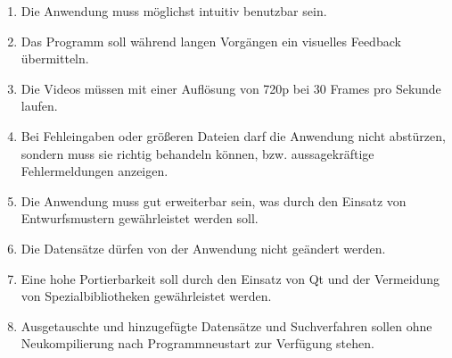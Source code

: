 \begin{enumerate}[label=\bfseries /NF \arabic*0/]
  \item Die Anwendung muss möglichst intuitiv benutzbar sein.
  \item Das Programm soll während langen Vorgängen ein visuelles Feedback übermitteln.
  \item Die Videos müssen mit einer Auflösung  von 720p bei 30 Frames pro Sekunde laufen.
  \item Bei Fehleingaben oder größeren Dateien darf die Anwendung nicht abstürzen, sondern muss sie richtig behandeln können, bzw. aussagekräftige Fehlermeldungen anzeigen.
  \item Die Anwendung muss gut erweiterbar sein, was durch den Einsatz von Entwurfsmustern gewährleistet werden soll.
  \item Die Datensätze dürfen von der Anwendung nicht geändert werden.
  \item Eine hohe Portierbarkeit soll durch den Einsatz von Qt und der Vermeidung von Spezialbibliotheken gewährleistet werden.
  \item Ausgetauschte und hinzugefügte Datensätze und Suchverfahren sollen ohne Neukompilierung nach Programmneustart zur Verfügung stehen.
\end{enumerate}
